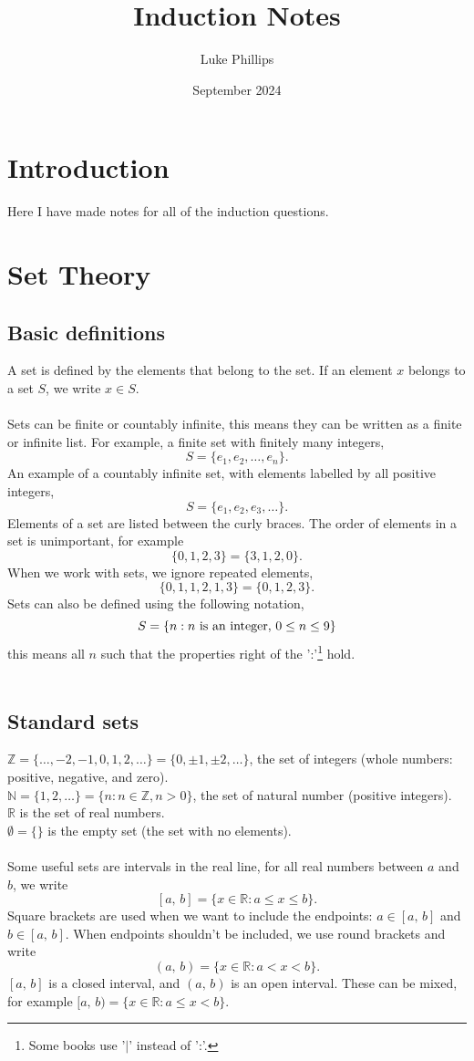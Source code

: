 \documentclass[10pt, a4paper]{article}
\title{Induction Notes}
\author{Luke Phillips}
\date{September 2024}
\newcommand{\N}{\mathbb{N}}
\newcommand{\Z}{\mathbb{Z}}
\newcommand{\R}{\mathbb{R}}
\begin{document}
\maketitle

\section{Introduction}
Here I have made notes for all of the induction questions.

\newpage

\section{Set Theory}

\subsection{Basic definitions}
A set is defined by the elements that belong to the set. If an element $x$ belongs to a set $S$, we write $x \in S$. \\
\\
Sets can be finite or countably infinite, this means they can be written as a finite or infinite list. For example, a finite set with finitely many integers, 
\[
S = \{e_1, e_2,\dotsc,e_n\}.
\]
An example of a countably infinite set, with elements labelled by all positive integers,
\[
S = \{e_1, e_2, e_3, \dotsc\}.
\]
Elements of a set are listed between the curly braces. The order of elements in a set is unimportant, for example
\[
\{0, 1, 2, 3\} = \{3, 1, 2, 0\}.
\]
When we work with sets, we ignore repeated elements,
\[
\{0, 1, 1, 2, 1, 3\} = \{0, 1, 2, 3\}.
\]
Sets can also be defined using the following notation,
\[
S = \{n : n \textnormal{ is an integer},\,0 \leq n \leq 9\}
\]
this means all $n$ such that the properties right of the ':'\footnote{Some books use '$\mid$' instead of ':'.} hold. \\
\\
\subsection{Standard sets}
$\Z = \{\dotsc, -2, -1, 0, 1, 2, \dotsc\} = \{0, \pm 1, \pm 2, \dotsc\}$, the set of integers (whole numbers: positive, negative, and zero). \\
$\N = \{1, 2, \dotsc\} = \{n: n \in \Z, n > 0\}$, the set of natural number (positive integers). \\
$\R$ is the set of real numbers. \\
$\emptyset = \{\}$ is the empty set (the set with no elements). \\
\\
Some useful sets are intervals in the real line, for all real numbers between $a$ and $b$, we write
\[
[a,\,b] = \{x \in \R : a \leq x \leq b\}.
\]
Square brackets are used when we want to include the endpoints: $a \in [a,\,b]$ and $b \in [a,\,b]$. When endpoints shouldn't be included, we use round brackets and write
\[
(a,\,b) = \{x \in \R : a < x < b\}.
\]
$[a,\,b]$ is a closed interval, and $(a,\,b)$ is an open interval. These can be mixed, for example $[a,\,b) = \{x \in \R : a \leq x < b\}$.
\end{document}
